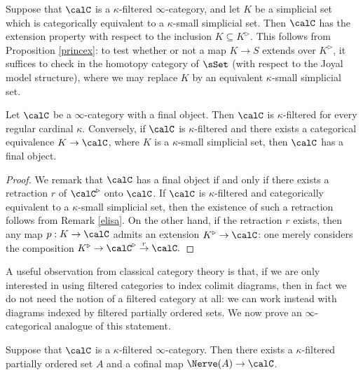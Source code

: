 \begin{remark}\label{elisa}
Suppose that $\calC$ is a $\kappa$-filtered $\infty$-category, and let $K$ be a simplicial set which is categorically equivalent to a $\kappa$-small simplicial set. Then $\calC$ has the extension property with respect to the inclusion $K \subseteq K^{\triangleright}$. This follows from Proposition \ref{princex}: to test whether or not a map $K \rightarrow S$ extends over $K^{\triangleright}$, it suffices to check in the homotopy category of $\sSet$ (with respect to the Joyal model structure), where we may replace $K$ by an equivalent $\kappa$-small simplicial set. 
\end{remark}

\begin{proposition}\label{smallity}
Let $\calC$ be a $\infty$-category with a final object. Then $\calC$ is
$\kappa$-filtered for every regular cardinal $\kappa$. Conversely, if $\calC$ is $\kappa$-filtered and there exists a categorical
equivalence $K \rightarrow \calC$, where $K$ is a $\kappa$-small simplicial set, then $\calC$ has a final object.
\end{proposition}

\begin{proof}
We remark that $\calC$ has a final object if and only if there exists
a retraction $r$ of $\calC^{\triangleright}$ onto $\calC$. If $\calC$ is $\kappa$-filtered and categorically equivalent to a $\kappa$-small simplicial set, then the existence of such a retraction follows from Remark \ref{elisa}. On the other hand, if
the retraction $r$ exists, then any map $p: K \rightarrow \calC$
admits an extension $K^{\triangleright} \rightarrow \calC$: one merely
considers the composition $ K^{\triangleright} \rightarrow \calC^{\triangleright} \stackrel{r}{\rightarrow} \calC.$
\end{proof}

A useful observation from classical category theory is that, if we are only interested in using filtered categories to index colimit diagrams, then in fact we do not need the notion of a filtered category at all: we can work instead with diagrams indexed by filtered partially ordered sets. We now prove an $\infty$-categorical analogue of this statement.

\begin{proposition}\label{rot}
Suppose that $\calC$ is a $\kappa$-filtered $\infty$-category. Then there
exists a $\kappa$-filtered partially ordered set $A$ and a cofinal map
$\Nerve(A) \rightarrow \calC$.
\end{proposition}

